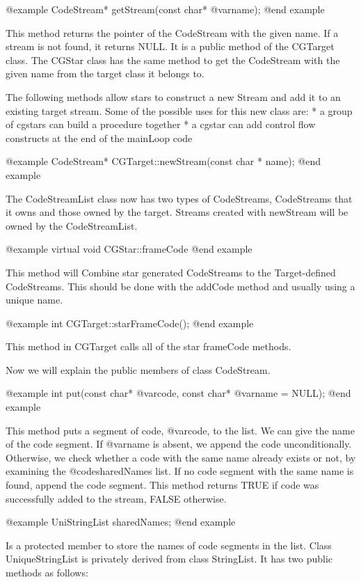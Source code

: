 @example
CodeStream* getStream(const char* @var{name});
@end example

This method returns the pointer of the CodeStream with the given name. If
a stream is not found, it returns NULL. It is a public method of the 
CGTarget class. The CGStar class has the same method to get the
CodeStream with the given name from the target class it belongs to.

The following methods allow stars to construct a new Stream and add it to
an existing target stream.  Some of the possible uses for this new class are:
* a group of cgstars can build a procedure together
* a cgstar can add control flow constructs at the end of the mainLoop code

@example
CodeStream* CGTarget::newStream(const char * name);
@end example

The CodeStreamList class now has two types of CodeStreams, CodeStreams that
it owns and those owned by the target.  Streams created with newStream
will be owned by the CodeStreamList.

@example
virtual void CGStar::frameCode
@end example

This method will Combine star generated CodeStreams to the Target-defined
CodeStreams.  This should be done with the addCode method and usually using
a unique name.

@example
int CGTarget::starFrameCode();
@end example

This method in CGTarget calls all of the star frameCode methods.

Now we will explain the public members of class CodeStream.

@example
int put(const char* @var{code}, const char* @var{name} = NULL);
@end example

This method puts a segment of code, @var{code}, to the list. We can give
the name of the code segment. If @var{name} is absent, we append the code
unconditionally. Otherwise, we check whether a code with the same name
already exists or not, by examining the @code{sharedNames} list. If no
code segment with the same name is found, append the code segment. This
method returns TRUE if code was successfully added to the stream, FALSE
otherwise.

@example
UniStringList sharedNames;
@end example

Is a protected member to store the names of code segments in the list.
Class UniqueStringList is privately derived from class StringList. It has
two public methods as follows:

